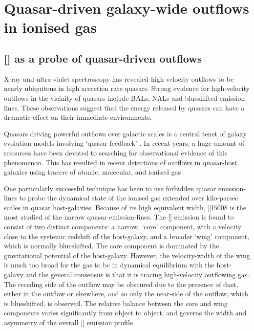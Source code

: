 
\chapter{Quasar-driven galaxy-wide outflows in ionised gas}

\label{ch:nlr} 

\section{[] as a probe of quasar-driven outflows}

X-ray and ultra-violet spectroscopy has revealed high-velocity outflows to be nearly ubiquitous in high accretion rate quasars.
Strong evidence for high-velocity outflows in the vicinity of quasars include BALs, NALs and blueshifted emission-lines. 
These observations suggest that the energy released by quasars can have a dramatic effect on their immediate environments. 

Quasars driving powerful outflows over galactic scales is a central tenet of galaxy evolution models involving `quasar feedback' \citep[e.g.][]{silk98,springel05,bower06}.
In recent years, a huge amount of resources have been devoted to searching for observational evidence of this phenomenon.  
This has resulted in recent detections of outflows in quasar-host galaxies using tracers of atomic, molecular, and ionised gas \citep[e.g.][]{nesvadba06,arav08,nesvadba08,moe09,alexander10,dunn10,feruglio10,nesvadba10,alatalo11,cano-diaz12,harrison12,harrison14,cimatti13,rupke13,veilleux13,cicone14,nardini15}.  

One particularly successful technique has been to use forbidden quasar emission-lines to probe the dynamical state of the ionised gas extended over kilo-parsec scales in quasar host-galaxies. 
Because of its high equivalent width, []\l$5008$ is the most studied of the narrow quasar emission-lines. 
The [] emission is found to consist of two distinct components: a narrow, `core' component, with a velocity close to the systemic redshift of the host-galaxy, and a broader `wing' component, which is normally blueshifted. 
The core component is dominated by the gravitational potential of the host-galaxy.
However, the velocity-width of the wing is much too broad for the gas to be in dynamical equilibrium with the host-galaxy \citep[e.g.][]{liu13} and the general consensus is that it is tracing high-velocity outflowing gas. The receding side of the outflow may be obscured due to the presence of dust, either in the outflow or elsewhere, and so only the near-side of the outflow, which is blueshifted, is observed. 
The relative balance between the core and wing components varies significantly from object to object, and governs the width and asymmetry of the overall [] emission profile \citep[e.g.][]{shen14}. 

